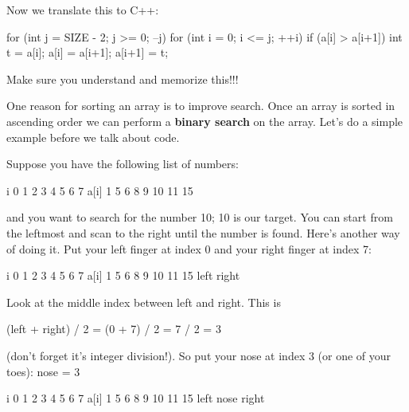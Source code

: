 Now we translate this to C++:

\begin{consolethree}[escapeinside=||]
for (int j = SIZE - 2; j >= 0; --j)
{
    for (int i = 0; i <= j; ++i)
    {
        if (a[i] > a[i+1])
        {
            int t = a[i];
            a[i] = a[i+1];
            a[i+1] = t;
        }
    }
}
\end{consolethree}

Make sure you understand and memorize this!!!




\newpage{}

One reason for sorting an array is to improve search. Once an array is
sorted in ascending order we can perform a \textbf{binary search} on the
array. Let's do a simple example before we talk about
code.

Suppose you have the following list of numbers:

\begin{consolethree}[escapeinside=||]
i      0    1    2    3    4    5    6    7
a[i]   1    5    6    8    9    10   11   15
\end{consolethree}

and you want to search for the number 10; 10 is our target. You can
start from the leftmost and scan to the right until the number is found.
Here's another way of doing it. Put your left finger at
index 0 and your right finger at index 7:

\begin{consolethree}[escapeinside=||]
i      0    1    2    3    4    5    6    7
a[i]   1    5    6    8    9    10   11   15
    left                                  right
\end{consolethree}

Look at the middle index between left and right. This is

(left + right) / 2 = (0 + 7) / 2 = 7 / 2 = 3

(don't forget it's integer division!). So put your nose at index 3 (or one of your toes): nose = 3

\begin{consolethree}[escapeinside=||]
i      0    1    2    3    4    5    6    7
a[i]   1    5    6    8    9    10   11   15
    left            nose                  right
\end{consolethree}

